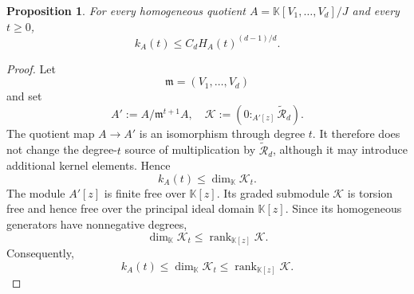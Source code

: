 \documentclass[11pt,reqno]{amsart}
\newcommand\K{\ensuremath{\mathbb{K}}}
\newtheorem{proposition}[theorem]{Proposition}
\theoremstyle{definition}
\theoremstyle{plain}
\numberwithin{equation}{section}
\begin{document}
\begin{proposition}
\label{prop:norm-defect}
For every homogeneous quotient $A=\K[V_1,\ldots,V_d]/J$ and every
$t\ge0$,
\begin{equation}\label{eq:norm-defect}
        k_A(t)\le C_dH_A(t)^{(d-1)/d}.
\end{equation}
\end{proposition}

\begin{proof}
Let
\begin{equation*}
    \mathfrak{m}=(V_1,\ldots,V_d)
\end{equation*}
and set
\begin{equation*}
    A':=A/\mathfrak{m}^{t+1}A,
    \quad
    \mathcal K:=
    \left(0:_{A'[z]}\widetilde{\mathcal R}_d\right).
\end{equation*}
The quotient map $A\to A'$ is an isomorphism through degree $t$.
It therefore does not change the degree-$t$ source of multiplication by
$\widetilde{\mathcal R}_d$, although it may introduce additional kernel
elements. Hence
\begin{equation*}
    k_A(t)
    \leq
    \dim_{\K}\mathcal K_t.
\end{equation*}
The module $A'[z]$ is finite free over $\K[z]$. Its graded submodule
$\mathcal K$ is torsion free and hence free over the principal ideal
domain $\K[z]$. Since its homogeneous generators have nonnegative
degrees,
\begin{equation*}
    \dim_{\K}\mathcal K_t
    \leq
    \operatorname{rank}_{\K[z]}\mathcal K.
\end{equation*}
Consequently,
\begin{equation*}
    k_A(t)
    \leq
    \dim_{\K}\mathcal K_t
    \leq
    \operatorname{rank}_{\K[z]}\mathcal K.
\end{equation*}





\end{proof}
\end{document}
